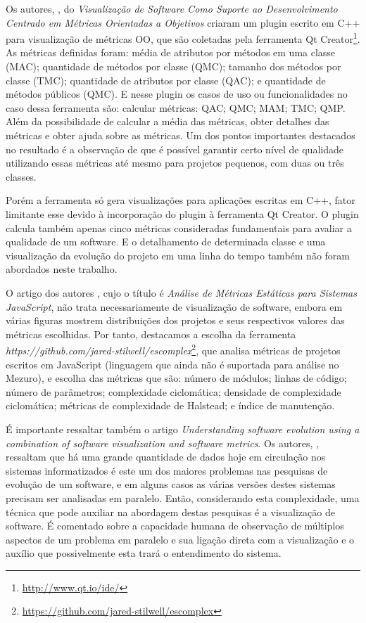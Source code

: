 Os autores, , do \textit{Visualização de Software
Como Suporte ao Desenvolvimento Centrado em Métricas Orientadas a Objetivos}
criaram um plugin escrito em C++ para visualização de métricas OO, que são
coletadas pela ferramenta Qt Creator\footnote{\url{http://www.qt.io/ide/}}. As
métricas definidas foram: média de atributos por métodos em uma classe (MAC);
quantidade de métodos por classe (QMC); tamanho dos métodos por classe (TMC);
quantidade de atributos por classe (QAC); e quantidade de métodos públicos
(QMC). E nesse plugin os casos de uso ou funcionalidades no caso dessa
ferramenta são: calcular métricas: QAC; QMC; MAM; TMC; QMP. Além da
possibilidade de calcular a média das métricas, obter detalhes das métricas e
obter ajuda sobre as métricas. Um dos pontos importantes destacados no
resultado é a observação de que é possível garantir certo nível de qualidade
utilizando essas métricas até mesmo para projetos pequenos, com duas ou três
classes.

Porém a ferramenta só gera visualizações para aplicações escritas em C++, fator
limitante esse devido à incorporação do plugin à ferramenta Qt Creator. O
plugin calcula também apenas cinco métricas consideradas fundamentais para
avaliar a qualidade de um software. E o detalhamento de determinada classe e
uma visualização da evolução do projeto em uma linha do tempo também não foram
abordados neste trabalho.

O artigo dos autores , cujo o título é \textit{Análise de
Métricas Estáticas para Sistemas JavaScript}, não trata necessariamente de
visualização de software, embora em várias figuras mostrem distribuições dos
projetos e seus respectivos valores das métricas escolhidas. Por tanto,
destacamos a escolha da ferramenta 
\textit{https://github.com/jared-stilwell/escomplex}\footnote{\url{https://github.com/jared-stilwell/escomplex}},
que analisa métricas de projetos escritos em JavaScript (linguagem que ainda
não é suportada para análise no Mezuro), e escolha das métricas que são: número
de módulos; linhas de código; número de parâmetros; complexidade ciclomática;
densidade de complexidade ciclomática; métricas de complexidade de Halstead; e
índice de manutenção.

É importante ressaltar também o artigo \textit{Understanding software evolution
using a combination of software visualization and software metrics}. Os
autores, , ressaltam que há uma grande
quantidade de dados hoje em circulação nos sistemas informatizados é este um
dos maiores problemas nas pesquisas de evolução de um software, e em alguns
casos as várias versões destes sistemas precisam ser analisadas em paralelo.
Então, considerando esta complexidade, uma técnica que pode auxiliar na
abordagem destas pesquisas é a visualização de software. É comentado sobre a
capacidade humana de observação de múltiplos aspectos de um problema em
paralelo e sua ligação direta com a visualização e o auxílio que possivelmente
esta trará o entendimento do sistema.


